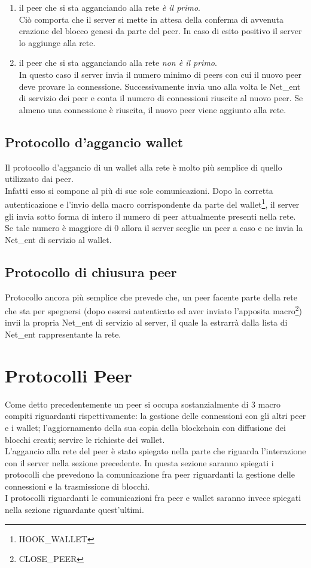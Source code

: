 \begin{enumerate}
\item il peer che si sta agganciando alla rete \textit{è il primo}. \\Ciò comporta che il server si mette in attesa della conferma di avvenuta crazione del blocco genesi da parte del peer. In caso di esito positivo il server lo aggiunge alla rete.
\item il peer che si sta agganciando alla rete \textit{non è il primo}. \\ In questo caso il server invia il numero minimo di peers con cui il nuovo peer deve provare la connessione. Successivamente invia uno alla volta le Net\_ent di servizio dei peer e conta il numero di connessioni riuscite al nuovo peer. Se almeno una connessione è riuscita, il nuovo peer viene aggiunto alla rete.
\end{enumerate}

\subsection{Protocollo d'aggancio wallet}
Il protocollo d'aggancio di un wallet alla rete è molto più semplice di quello utilizzato dai peer.\\ Infatti esso si compone al più di sue sole comunicazioni.
Dopo la corretta autenticazione e l'invio della macro  corrispondente da parte del wallet\footnote{HOOK\_WALLET}, il server gli invia sotto forma di intero il numero di peer attualmente presenti nella rete. Se tale numero è maggiore di 0 allora il server sceglie un peer a caso e ne invia la Net\_ent di servizio al wallet.

\subsection{Protocollo di chiusura peer}
Protocollo ancora più semplice che prevede che, un peer facente parte della rete che sta per spegnersi (dopo essersi autenticato ed aver inviato l'apposita macro\footnote{CLOSE\_PEER}) invii la propria Net\_ent di servizio al server, il quale la estrarrà dalla lista di Net\_ent rappresentante la rete.

\section{Protocolli Peer}
Come detto precedentemente un peer si occupa sostanzialmente di 3 macro compiti riguardanti rispettivamente: la gestione delle connessioni con gli altri peer e i wallet; l'aggiornamento della sua copia della blockchain con diffusione dei blocchi creati;  servire le richieste dei wallet.\\
L'aggancio alla rete del peer è stato spiegato nella parte che riguarda l'interazione con il server nella sezione precedente. 
In questa sezione saranno spiegati i protocolli che prevedono la comunicazione fra peer riguardanti la gestione delle connessioni e la trasmissione di blocchi.\\
I protocolli riguardanti le comunicazioni fra peer e wallet saranno invece spiegati nella sezione riguardante quest'ultimi.

